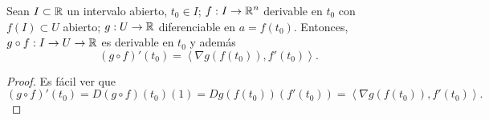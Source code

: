 \begin{colorary}
Sean $\displaystyle I \subset \mathbb{R} $ un intervalo abierto, $\displaystyle t_{0} \in I $; $\displaystyle f : I \to \mathbb{R}^{n} $ derivable en $\displaystyle t_{0} $ con $\displaystyle f\left(I\right) \subset U $ abierto; $\displaystyle g : U \to \mathbb{R} $ diferenciable en $\displaystyle a = f\left(t_{0}\right) $. Entonces, $\displaystyle g\circ f : I \to U \to \mathbb{R} $ es derivable en $\displaystyle t_{0} $ y además
\[\left(g\circ f\right)'\left(t_{0}\right) = \left\langle \nabla g\left(f\left(t_{0}\right)\right), f'\left(t_{0}\right) \right\rangle  .\]
\end{colorary}
\begin{proof}
Es fácil ver que
\[\left(g\circ f\right)'\left(t_{0}\right) = D\left(g\circ f\right)\left(t_{0}\right)\left(1\right) = Dg\left(f\left(t_{0}\right)\right)\left(f'\left(t_{0}\right)\right) = \left\langle \nabla g\left(f\left(t_{0}\right)\right), f'\left(t_{0}\right) \right\rangle  .\]
\end{proof}
